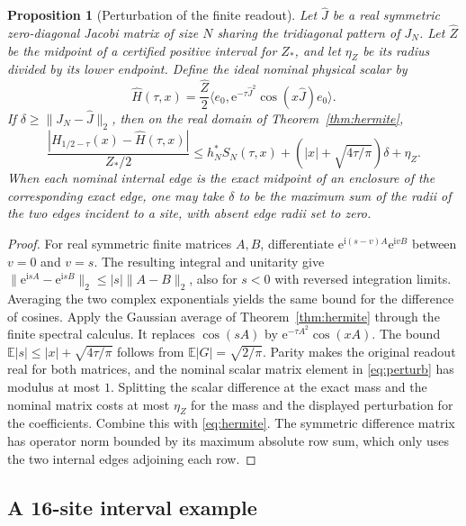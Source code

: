 \documentclass[11pt]{article}
\numberwithin{equation}{section}
\newtheorem{proposition}[theorem]{Proposition}
\newcommand{\ee}{\mathrm e}
\newcommand{\ii}{\mathrm i}
\newcommand{\ip}[2]{\langle #1,#2\rangle}
\begin{document}
\begin{proposition}[Perturbation of the finite readout]\label{prop:perturb}
Let \(\widehat J\) be a real symmetric zero-diagonal Jacobi
matrix of size \(N\) sharing the tridiagonal pattern of \(J_N\).
Let \(\widehat Z\) be the midpoint of a certified positive interval
for \(Z_*\), and let \(\eta_Z\) be its radius divided by its lower
endpoint. Define the ideal nominal physical scalar by
\[
 \widehat H(\tau,x)=\frac{\widehat Z}{2}
   \ip{e_0}{\ee^{-\tau\widehat J^2}\cos(x\widehat J)e_0}.
\]
If \(\delta\ge\|J_N-\widehat J\|_2\), then on the real domain
of Theorem~\ref{thm:hermite},
\begin{equation}\label{eq:perturb}
 \frac{|H_{1/2-\tau}(x)-\widehat H(\tau,x)|}{Z_*/2}
 \le h_N^*S_N(\tau,x)
       +\left(|x|+\sqrt{4\tau/\pi}\right)\delta+\eta_Z.
\end{equation}
When each nominal internal edge is the exact midpoint of an
enclosure of the corresponding exact edge, one may take \(\delta\)
to be the maximum sum of the radii of the two edges incident to
a site, with absent edge radii set to zero.
\end{proposition}
\begin{proof}
For real symmetric finite matrices \(A,B\), differentiate
\(\ee^{\ii(s-v)A}\ee^{\ii vB}\) between \(v=0\) and \(v=s\).
The resulting integral and unitarity give
\(\|\ee^{\ii sA}-\ee^{\ii sB}\|_2\le |s|\|A-B\|_2\),
also for \(s<0\) with reversed integration limits. Averaging
the two complex exponentials yields the same bound for the
difference of cosines. Apply the Gaussian average of
Theorem~\ref{thm:hermite} through the finite spectral calculus.
It replaces \(\cos(sA)\) by \(\ee^{-\tau A^2}\cos(xA)\).
The bound \(\mathbb E|s|\le|x|+\sqrt{4\tau/\pi}\) follows
from \(\mathbb E|G|=\sqrt{2/\pi}\). Parity makes the original
readout real for both matrices, and the nominal scalar matrix
element in \eqref{eq:perturb} has modulus at most \(1\).
Splitting the scalar difference at the exact mass and the
nominal matrix costs at most \(\eta_Z\) for the mass and the
displayed perturbation for the coefficients. Combine this
with \eqref{eq:hermite}. The symmetric difference matrix has
operator norm bounded by its maximum absolute row sum,
which only uses the two internal edges adjoining each row.
\end{proof}

\subsection{A 16-site interval example}\label{sec:example}
\end{document}
